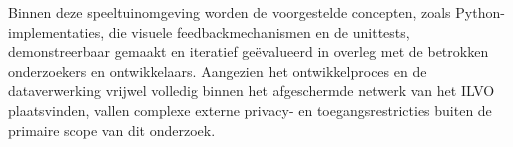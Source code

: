 Binnen deze speeltuinomgeving worden de voorgestelde concepten, zoals Python-implementaties, die visuele feedbackmechanismen en de unittests, demonstreerbaar gemaakt en iteratief ge\"{e}valueerd in overleg met de betrokken onderzoekers en ontwikkelaars.
Aangezien het ontwikkelproces en de dataverwerking vrijwel volledig binnen het afgeschermde netwerk van het ILVO plaatsvinden, vallen complexe externe privacy- en toegangsrestricties buiten de primaire scope van dit onderzoek.
